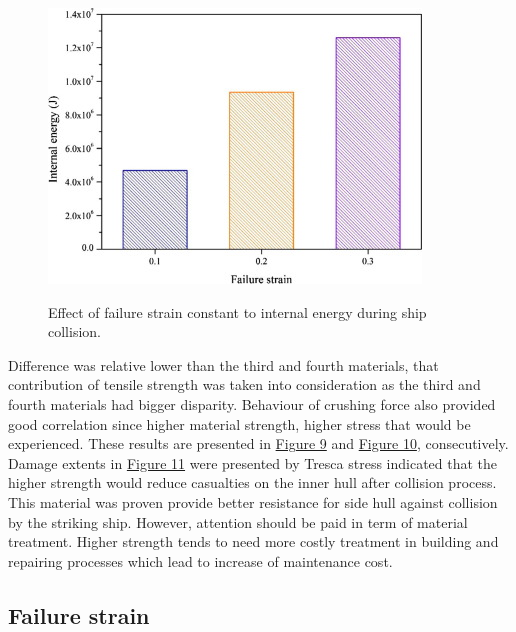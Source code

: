 \documentclass[../Final.tex]{subfiles}
\begin{document}
    
\begin{figure}[ht]
    \centering
    \includegraphics[width=\columnwidth]{fig12.jpg}
    \label{fig12}
    \caption{Effect of failure strain constant to internal energy during ship collision.}
\end{figure}

Difference was relative lower than the third and fourth materials, that contribution of tensile strength was taken into consideration as the third and fourth materials had bigger disparity. 
Behaviour of crushing force also provided good correlation since higher material strength, higher stress that would be experienced. These results are presented in \hyperref[fig9]{Figure 9} and \hyperref[fig10]{Figure 10}, consecutively. 
Damage extents in \hyperref[fig11]{Figure 11} were presented by Tresca stress indicated that the higher strength would reduce casualties on the inner hull after collision process. 
This material was proven provide better resistance for side hull against collision by the striking ship. However, attention should be paid in term of material treatment. 
Higher strength tends to need more costly treatment in building and repairing processes which lead to increase of maintenance cost. 

\subsection{Failure strain}
\end{document}

